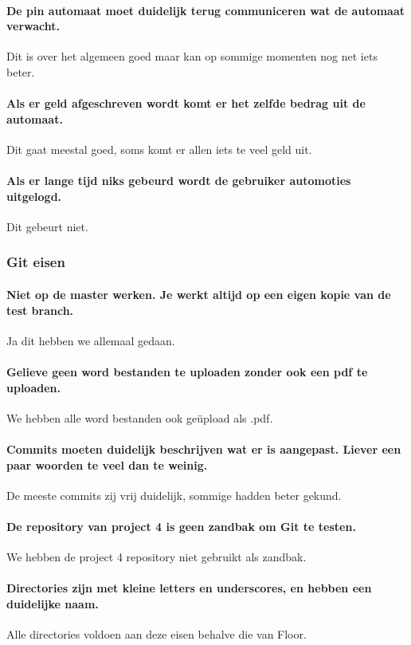 \documentclass{article}
\begin{document}
\paragraph{De pin automaat moet duidelijk terug communiceren wat de automaat verwacht.}
Dit is over het algemeen goed maar kan op sommige momenten nog net iets beter.

\paragraph{Als er geld afgeschreven wordt komt er het zelfde bedrag uit de automaat.}
Dit gaat meestal goed, soms komt er allen iets te veel geld uit.

\paragraph{Als er lange tijd niks gebeurd wordt de gebruiker automoties uitgelogd.}
Dit gebeurt niet.

\subsubsection{Git eisen}
\paragraph{Niet op de master werken. Je werkt altijd op een eigen kopie van de test branch.}
Ja dit hebben we allemaal gedaan.

\paragraph{Gelieve geen word bestanden te uploaden zonder ook een pdf te uploaden.}
We hebben alle word bestanden ook ge\"upload als .pdf.

\paragraph{Commits moeten duidelijk beschrijven wat er is aangepast. Liever een paar woorden te veel dan te weinig.}
De meeste commits zij vrij duidelijk, sommige hadden beter gekund.

\paragraph{De repository van project 4 is geen zandbak om Git te testen.}
We hebben de project 4 repository niet gebruikt als zandbak.
\paragraph{Directories zijn met kleine letters en underscores, en hebben een duidelijke naam.}
Alle directories voldoen aan deze eisen behalve die van Floor.
\end{document}
